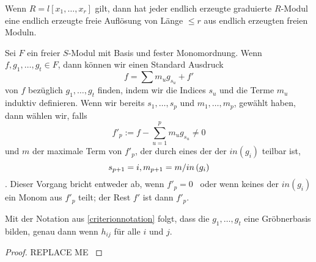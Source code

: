 \documentclass{article}
\begin{document}
\maketitle
\begin{thm}
	Wenn 
	\( R = l \left[ x_1,\dots,x_r \right] \)
	gilt,
	dann hat jeder endlich erzeugte graduierte 
	\(R \)-Modul 
	eine endlich erzeugte freie Aufl\"osung von L\"ange 
	\( \le r \) 
	aus endlich erzeugten freien Moduln.
\end{thm}

\begin{algo}
	Sei 
	\( F \)
	ein freier 
	\( S\)-Modul
	mit Basis und fester Monomordnung.
	Wenn
	\( f,g_1,\dots,g_t \in F \),
	dann k\"onnen wir einen Standard Ausdruck
	\[
	        f=\sum m_u g_{s_u} +f'
	\]
	von
	\( f \)
	bez\"uglich 
	\( g_1,\dots,g_t \)
	finden,
	indem wir die Indices
	\( s_{u} \)
	und die Terme
	\(m_{u} \)
	induktiv definieren.
	Wenn wir bereits 
	\( s_1,\dots,s_p \)
	und
	\( m_1,\dots,m_p\),
	gew\"ahlt haben,
	dann w\"ahlen wir, 
	falls 
	\[
		f'_p:=f-\sum_{u=1}^{p} m_u g_{s_u} \neq 0
	\]
	und
	\( m \) 
	der maximale Term von 
	\(f'_p \),
	der durch eines der der
	\( in\left( g_i \right) \)
	teilbar ist,
	\[
		s_{p+1}=i , \\
		m_{p+1}=m / in\left( g_i \right)
	\].
	Dieser Vorgang bricht entweder ab, wenn 
	\( f'_p=0 \) \
	oder wenn keines der
	\( in\left( g_i \right) \) 
	ein Monom aus 
	\( f'_p\)
	teilt;
	der Rest 
	\(f'\) 
	ist dann 
	\( f'_p \).
\end{algo}

\begin{thm}
	Mit der Notation aus \ref{criterionnotation} folgt,
	dass die 
	\( g_{1},\dots,g_{t} \)
	eine Gr\"obnerbasis bilden,
	genau dann wenn 
	\( h_{ij} \)
	f\"ur alle 
	\( i \)
	und 
	\( j\).
	\begin{proof}
		{\color{red} REPLACE ME }
	\end{proof}
\end{thm}
\end{document}
